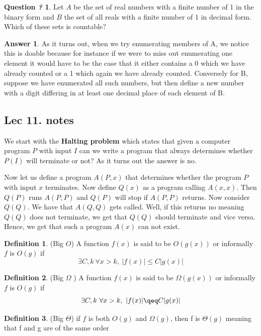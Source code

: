 \documentclass[titlepage]{article}
\theoremstyle{definition}
\newtheorem{definition}{Definition}
\numberwithin{equation}{subsection}
\numberwithin{remark}{subsection}
\newtheorem{question}{Question \textit{?}}[subsection]
\newtheorem{answer}{Answer}[subsection]
\begin{document}
\begin{question}
Let $A$ be the set of real numbers with a finite number of 1 in the binary form and $B$ the set of all reals with a finite number of 1 in decimal form. Which of these sets is countable?
\end{question}
\begin{answer}
As it turns out, when we try enumerating members of A, we notice this is doable because for instance if we were to miss out enumerating one element it would have to be the case that it either contains a 0 which  we have already counted or a 1 which again we have already counted. Conversely for B, suppose we have enumerated all such numbers, but then define a new number with a digit differing in at least one decimal place of each element of B. 
\end{answer}

\subsection{Lec 11. notes}
We start with the \textbf{Halting problem} which states that given a computer program $P$ with input $I$ can we write a program that always determines whether $P(I)$ will terminate or not? As it turns out the answer is no.
\begin{example*}
Now let us define a program $A(P,x)$ that determines whether the program $P$ with input $x$ terminates. Now define $Q(x)$ as a program calling $A(x,x)$. Then $Q(P)$ runs $A(P,P)$ and $Q(P)$ will stop if $A(P,P)$ returns. Now consider $Q(Q)$. We have that $A(Q,Q)$ gets called. Well, if this returns no meaning $Q(Q)$ does not terminate, we get that $Q(Q)$ should terminate and vice versa. Hence, we get that such a program $A(x)$ can not exist. 
\end{example*}

\begin{definition}(Big $O$)
A function $f(x)$ is said to be $O(g(x))$ or informally $f$ is $O(g)$ if $$ \exists C,k \ \forall x>k, \ |f(x)| \leq C|g(x)|$$
\end{definition}


\begin{definition}(Big $\Omega$ )
A function $f(x)$ is said to be $\Omega(g(x))$ or informally $f$ is $O(g)$ if $$ \exists C,k \ \forall x>k, \ |f(x)| \qeq C|g(x)|$$
\end{definition}

\begin{definition}(Big $\Theta$)
if $f$ is both $O(g)$ and $\Omega(g)$, then f is $\Theta(g)$ meaning that f and g are of the same order
\end{definition}
\end{document}
